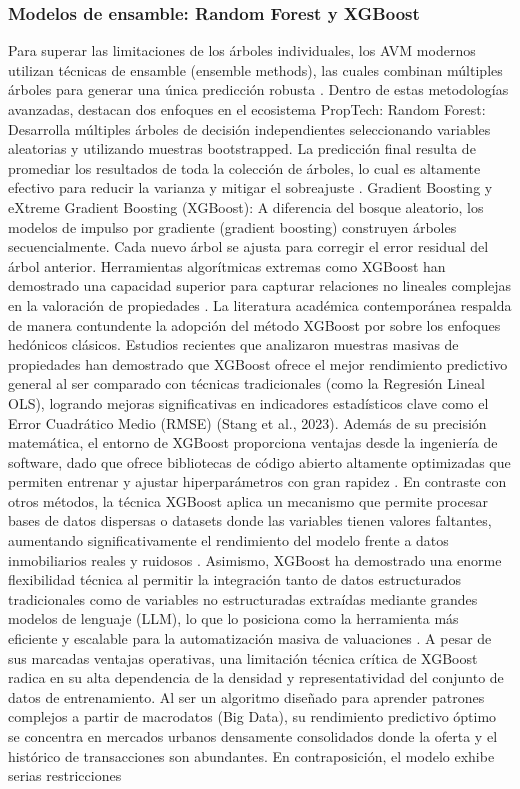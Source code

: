 \subsubsection{Modelos de ensamble: Random Forest y XGBoost}

Para superar las limitaciones de los árboles individuales, los AVM modernos utilizan técnicas de ensamble (ensemble methods), las cuales combinan múltiples árboles para generar una única predicción robusta \parencite{BirkelandEtAl2021}. Dentro de estas metodologías avanzadas, destacan dos enfoques en el ecosistema PropTech: Random Forest: Desarrolla múltiples árboles de decisión independientes seleccionando variables aleatorias y utilizando muestras bootstrapped. La predicción final resulta de promediar los resultados de toda la colección de árboles, lo cual es altamente efectivo para reducir la varianza y mitigar el sobreajuste \parencite{BirkelandEtAl2021}. Gradient Boosting y eXtreme Gradient Boosting (XGBoost): A diferencia del bosque aleatorio, los modelos de impulso por gradiente (gradient boosting) construyen árboles secuencialmente. Cada nuevo árbol se ajusta para corregir el error residual del árbol anterior. Herramientas algorítmicas extremas como XGBoost han demostrado una capacidad superior para capturar relaciones no lineales complejas en la valoración de propiedades \parencite{Babtan2024}. La literatura académica contemporánea respalda de manera contundente la adopción del método XGBoost por sobre los enfoques hedónicos clásicos. Estudios recientes que analizaron muestras masivas de propiedades han demostrado que XGBoost ofrece el mejor rendimiento predictivo general al ser comparado con técnicas tradicionales (como la Regresión Lineal OLS), logrando mejoras significativas en indicadores estadísticos clave como el Error Cuadrático Medio (RMSE) (Stang et al., 2023). Además de su precisión matemática, el entorno de XGBoost proporciona ventajas desde la ingeniería de software, dado que ofrece bibliotecas de código abierto altamente optimizadas que permiten entrenar y ajustar hiperparámetros con gran rapidez \parencite{BirkelandEtAl2021}. En contraste con otros métodos, la técnica XGBoost aplica un mecanismo que permite procesar bases de datos dispersas o datasets donde las variables tienen valores faltantes, aumentando significativamente el rendimiento del modelo frente a datos inmobiliarios reales y ruidosos \parencite{Babtan2024}. Asimismo, XGBoost ha demostrado una enorme flexibilidad técnica al permitir la integración tanto de datos estructurados tradicionales como de variables no estructuradas extraídas mediante grandes modelos de lenguaje (LLM), lo que lo posiciona como la herramienta más eficiente y escalable para la automatización masiva de valuaciones \parencite{FaxvaagEtAl2025}. A pesar de sus marcadas ventajas operativas, una limitación técnica crítica de XGBoost radica en su alta dependencia de la densidad y representatividad del conjunto de datos de entrenamiento. Al ser un algoritmo diseñado para aprender patrones complejos a partir de macrodatos (Big Data), su rendimiento predictivo óptimo se concentra en mercados urbanos densamente consolidados donde la oferta y el histórico de transacciones son abundantes. En contraposición, el modelo exhibe serias restricciones 